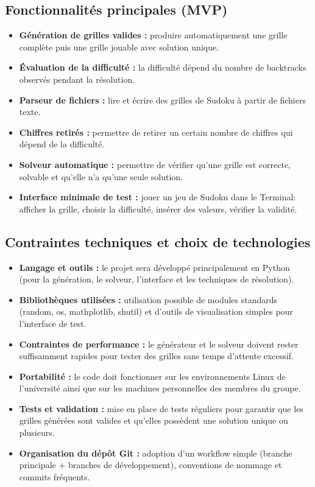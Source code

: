 \documentclass[a4paper]{article}
\begin{document}
\subsection*{Fonctionnalités principales (MVP)}
\begin{itemize}
  \item \textbf{Génération de grilles valides :} produire automatiquement une grille complète puis une grille jouable avec solution unique.
  \item \textbf{Évaluation de la difficulté :} la difficulté dépend du nombre de backtracks observés pendant la résolution.
  \item \textbf{Parseur de fichiers :} lire et écrire des grilles de Sudoku à partir de fichiers texte.
  \item \textbf{Chiffres retirés :} permettre de retirer un certain nombre de chiffres qui dépend de la difficulté.
  \item \textbf{Solveur automatique :} permettre de vérifier qu’une grille est correcte, solvable et qu’elle n’a qu’une seule solution.
  \item \textbf{Interface minimale de test :} jouer un jeu de Sudoku dans le Terminal: afficher la grille, choisir la difficulté, insérer des valeurs, vérifier la validité.
\end{itemize}

\subsection*{Contraintes techniques et choix de technologies}
\begin{itemize}
  \item \textbf{Langage et outils :} le projet sera développé principalement en Python (pour la génération, le solveur, l'interface et les techniques de résolution).
  \item \textbf{Bibliothèques utilisées :} utilisation possible de modules standards (random, os, mathplotlib, shutil) et d’outils de visualisation simples pour l’interface de test.
  \item \textbf{Contraintes de performance :} le générateur et le solveur doivent rester suffisamment rapides pour tester des grilles sans temps d’attente excessif.
  \item \textbf{Portabilité :} le code doit fonctionner sur les environnements Linux de l’université ainsi que sur les machines personnelles des membres du groupe.
  \item \textbf{Tests et validation :} mise en place de tests réguliers pour garantir que les grilles générées sont valides et qu’elles possèdent une solution unique ou plusieurs.
  \item \textbf{Organisation du dépôt Git :} adoption d’un workflow simple (branche principale + branches de développement), conventions de nommage et commits fréquents.
\end{itemize}
\end{document}
